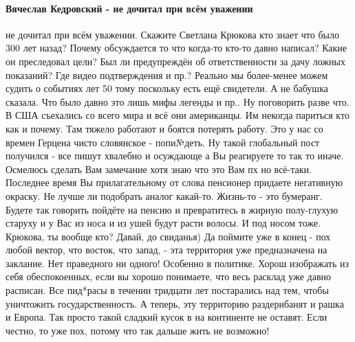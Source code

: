 \paragraph{Вячеслав Кедровский - не дочитал при всём уважении}
\begin{itemize}

не дочитал при всём уважении. Скажите Светлана Крюкова кто знает что было 300
лет назад? Почему обсуждается то что когда-то кто-то давно написал? Какие он
преследовал цели? Был ли предупреждён об ответственности за дачу ложных
показаний? Где видео подтверждения и пр.? Реально мы более-менее можем судить о
событиях лет 50 тому поскольку есть ещё свидетели. А не бабушка сказала. Что
было давно это лишь мифы легенды и пр.. Ну поговорить разве что. В США
съехались со всего мира и всё они американцы. Им некогда париться кто как и
почему. Там тяжело работают и боятся потерять работу. Это у нас со времен
Герцена чисто словянское - попи№деть. Ну такой глобальный пост получился - все
пишут хвалебно и осуждающе а Вы реагируете то так то иначе. Осмелюсь сделать
Вам замечание хотя знаю что это Вам пх но всё-таки. Последнее время Вы
прилагательному от слова пенсионер придаете негативную окраску. Не лучше ли
подобрать аналог какай-то. Жизнь-то - это бумеранг. Будете так говорить пойдёте
на пенсию и превратитесь в жирную полу-глухую старуху и у Вас из носа и из ушей
будут расти волосы. И под носом тоже.
Крюкова, ты вообще кто? Давай, до свиданья)
Да поймите уже в конец - пох любой вектор, что восток, что запад, - эта
территория уже предназначена на заклание. Нет праведного ни одного! Особенно в
политике. Хорош изображать из себя обеспокоенных, если вы хорошо понимаете, что
весь расклад уже давно расписан. Все пид*расы в течении тридцати лет
постарались над тем, чтобы уничтожить государственность. А теперь, эту
территорию раздерибанят и рашка и Европа. Так просто такой сладкий кусок в на
континенте не оставят. Если честно, то уже пох, потому что так дальше жить не
возможно!


\end{itemize}
